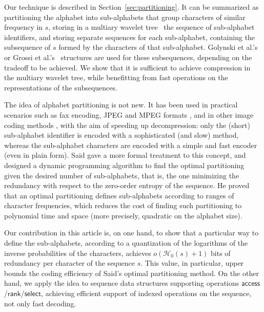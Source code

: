\documentclass[11pt]{article}
\newcommand{\access}
    {\ensuremath{\mathsf{access}}}
\newcommand{\rank}
    {\ensuremath{\mathsf{rank}}}
\newcommand{\select}
    {\ensuremath{\mathsf{select}}}
\newcommand{\HH}{\mathcal{H}}
\newcommand{\Ho}{\HH_0}
\begin{document}
Our technique is described in Section~\ref{sec:partitioning}.  It can
be summarized as partitioning the alphabet into sub-alphabets that
group characters of similar frequency in $s$, storing in a multiary
wavelet tree~\cite{FMMN07} the sequence of sub-alphabet identifiers,
and storing separate sequences for each sub-alphabet, containing the
subsequence of $s$ formed by the characters of that
sub-alphabet. Golynski et al.'s~\cite{GMR06} or Grossi et
al.'s~\cite{GOR10} structures are used for these subsequences,
depending on the tradeoff to be achieved. We show that it is sufficient to
achieve compression in the multiary wavelet tree, while benefitting
from fast operations on the representations of the
subsequences.

The idea of alphabet partitioning is not new. It has been used in
practical scenarios such as fax encoding, JPEG and MPEG formats
\cite{PM92,HPN97}, and in other image coding methods \cite{PINS04},
with the aim of speeding up decompression: only the (short)
sub-alphabet identifier is encoded with a sophisticated (and slow)
method, whereas the sub-alphabet characters are encoded with a simple
and fast encoder (even in plain form). Said \cite{Sai05} gave a more
formal treatment to this concept, and designed a dynamic programming
algorithm to find the optimal partitioning given the desired number of
sub-alphabets, that is, the one minimizing the redundancy with respect
to the zero-order entropy of the sequence. He proved that an optimal
partitioning defines sub-alphabets according to ranges of character
frequencies, which reduces the cost of finding such
partitioning to polynomial time and space (more precisely, quadratic
on the alphabet size).

Our contribution in this article is, on one hand, to show that a
particular way to define the sub-alphabets, according to a
quantization of the logarithms of the inverse probabilities of the
characters, achieves $o(\Ho(s)+1)$ bits of redundancy per character of
the sequence $s$. This value, in particular, upper bounds the coding
efficiency of Said's optimal partitioning method.  On the other hand,
we apply the idea to sequence data structures supporting operations
\access/\rank/\select, achieving efficient support of indexed operations 
on the sequence, not only fast decoding.
\end{document}

